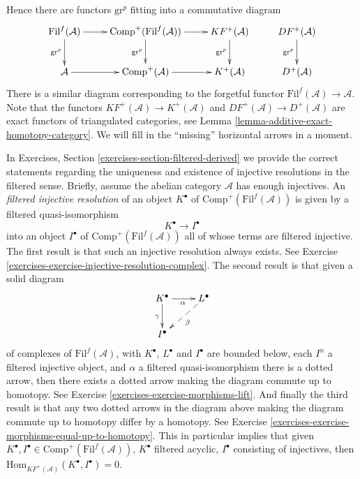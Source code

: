 \noindent
Hence there are functors $\text{gr}^p$ fitting
into a commutative diagram
$$
\xymatrix{
\text{Fil}^f(\mathcal{A}) \ar[r] \ar[d]_{\text{gr}^p} &
\text{Comp}^{+}(\text{Fil}^f(\mathcal{A})) \ar[r] \ar[d]_{\text{gr}^p} &
KF^{+}(\mathcal{A}) \ar[d]_{\text{gr}^p} &
DF^{+}(\mathcal{A}) \ar[d]_{\text{gr}^p} \\
\mathcal{A} \ar[r] &
\text{Comp}^{+}(\mathcal{A}) \ar[r] &
K^{+}(\mathcal{A}) &
D^{+}(\mathcal{A})
}
$$
There is a similar diagram corresponding to the forgetful
functor $\text{Fil}^f(\mathcal{A}) \to \mathcal{A}$.
Note that the functors $KF^{+}(\mathcal{A}) \to K^{+}(\mathcal{A})$
and $DF^{+}(\mathcal{A}) \to D^{+}(\mathcal{A})$
are exact functors of triangulated categories,
see Lemma \ref{lemma-additive-exact-homotopy-category}.
We will fill in the ``missing'' horizontal arrows in a moment.

\medskip\noindent
In Exercises, Section \ref{exercises-section-filtered-derived}
we provide the correct statements regarding the uniqueness and
existence of injective resolutions in the filtered sense.
Briefly, assume the abelian category $\mathcal{A}$ has enough injectives.
An {\it filtered injective resolution} of an object $K^\bullet$
of $\text{Comp}^{+}(\text{Fil}^f(\mathcal{A}))$
is given by a filtered quasi-isomorphism
$$
K^\bullet \longrightarrow I^\bullet
$$
into an object $I^\bullet$ of $\text{Comp}^{+}(\text{Fil}^f(\mathcal{A}))$
all of whose terms are filtered injective. The first result is that such
an injective resolution always exists.
See Exercise \ref{exercises-exercise-injective-resolution-complex}.
The second result is that given a solid diagram
$$
\xymatrix{
K^\bullet \ar[r]_\alpha \ar[d]_\gamma & L^\bullet \ar@{-->}[dl]^\beta \\
I^\bullet
}
$$
of complexes of $\text{Fil}^f(\mathcal{A})$, with $K^\bullet$, $L^\bullet$
and $I^\bullet$ are bounded below, each $I^n$ a filtered injective object,
and $\alpha$ a filtered quasi-isomorphism there is a dotted arrow, then there
exists a dotted arrow making the diagram commute up to homotopy.
See Exercise \ref{exercises-exercise-morphisms-lift}.
And finally the third result is that any two dotted arrows in the diagram
above making the diagram commute up to homotopy differ by a homotopy.
See Exercise \ref{exercises-exercise-morphisms-equal-up-to-homotopy}.
This in particular implies that given
$K^\bullet, I^\bullet \in \text{Comp}^{+}(\text{Fil}^f(\mathcal{A}))$,
$K^\bullet$ filtered acyclic, $I^\bullet$ consisting of injectives,
then $\text{Hom}_{KF^{+}(\mathcal{A})}(K^\bullet, I^\bullet) = 0$.


